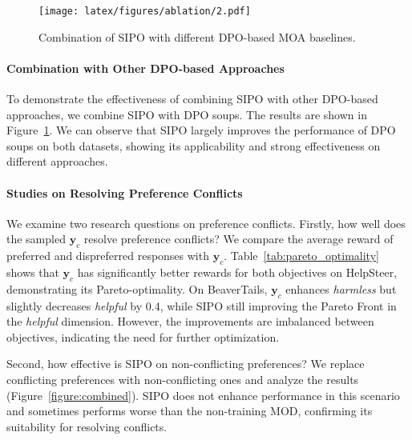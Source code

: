 \begin{figure}[t]
 \setlength{\abovecaptionskip}{0.05cm}
 \setlength{\belowcaptionskip}{0cm}
    \centering
    \texttt{[image: latex/figures/ablation/2.pdf]}
    \caption{Combination of SIPO with different DPO-based MOA baselines.}
    \label{fig:integration}
\end{figure}



\paragraph{Combination with Other DPO-based Approaches} \label{sec:combination_wsoups}
To demonstrate the effectiveness of combining SIPO with other DPO-based approaches, we combine SIPO with DPO soups. 
The results are shown in Figure~\ref{fig:integration}.
We can observe that SIPO largely improves the performance of DPO soups on both datasets, showing its applicability and strong effectiveness on different approaches.



\paragraph{Studies on Resolving Preference Conflicts}
We examine two research questions on preference conflicts.
Firstly, how well does the sampled $\textbf{y}_c$ resolve preference conflicts? 
We compare the average reward of preferred and dispreferred responses with $\textbf{y}_c$. 
Table~\ref{tab:pareto_optimality} shows that $\textbf{y}_c$ has significantly better rewards for both objectives on HelpSteer, demonstrating its Pareto-optimality. On BeaverTails, $\textbf{y}_c$ enhances \textit{harmless} but slightly decreases \textit{helpful} by 0.4, while SIPO still improving the Pareto Front in the \textit{helpful} dimension. However, the improvements are imbalanced between objectives, indicating the need for further optimization.


Second, how effective is SIPO on non-conflicting preferences? We replace conflicting preferences with non-conflicting ones and analyze the results (\cf Figure~\ref{figure:combined}). SIPO does not enhance performance in this scenario and sometimes performs worse than the non-training MOD, confirming its suitability for resolving conflicts.


